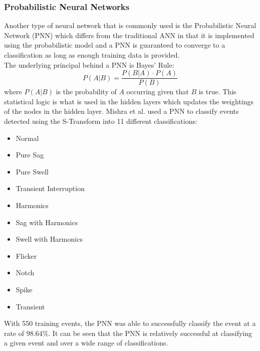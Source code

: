 \documentclass[12pt]{article}
\begin{document}
{\subsubsection{Probabilistic Neural Networks}
Another type of neural network that is commonly used is the Probabilistic Neural Network (PNN) which differs from the traditional ANN in that it is implemented using the probabilistic model and a PNN is guaranteed to converge to a classification as long as enough training data is provided. \newline
\\
The underlying principal behind a PNN is Bayes' Rule:
$$P(A|B) = \frac{P(B|A)\cdot P(A)}{P(B)}$$
where $P(A|B)$ is the probability of $A$ occurring given that $B$ is true. This statistical logic is what is used in the hidden layers which updates the weightings of the nodes in the hidden layer. 
Mishra et al. \cite{PNN} used a PNN to classify events detected using the S-Transform into 11 different classifications:
\begin{multicols}{2}

\begin{itemize}
\item Normal
\item Pure Sag
\item Pure Swell
\item Transient Interruption
\item Harmonics
\item Sag with Harmonics
\end{itemize} 
\columnbreak
\begin{itemize}
\item Swell with Harmonics
\item Flicker
\item Notch
\item Spike
\item Transient
\end{itemize}

\end{multicols}
With 550 training events, the PNN was able to successfully classify the event at a rate of 98.64\%. It can be seen that the PNN is relatively successful at classifying a given event and over a wide range of classifications. 



\newpage
}
\end{document}
